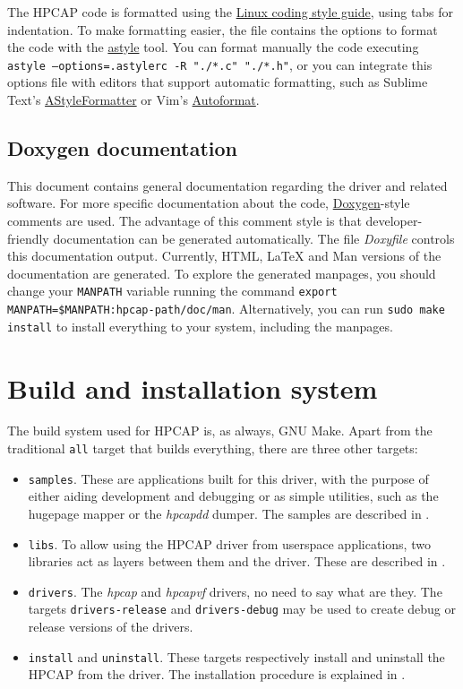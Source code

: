 \documentclass[oneside]{hpman}
\begin{document}
The HPCAP code is formatted using the \href{https://www.kernel.org/doc/Documentation/CodingStyle}{Linux coding style guide}, using tabs for indentation. To make formatting easier, the file  contains the options to format the code with the \href{http://astyle.sourceforge.net/astyle.html}{astyle} tool. You can format manually the code executing \texttt{astyle --options=.astylerc -R "./*.c" "./*.h"}, or you can integrate this options file with editors that support automatic formatting, such as Sublime Text's \href{https://github.com/timonwong/SublimeAStyleFormatter}{AStyleFormatter} or Vim's \href{https://github.com/Chiel92/vim-autoformat}{Autoformat}.

\section{Doxygen documentation}
\label{sec:doxygen}

This document contains general documentation regarding the driver and related software. For more specific documentation about the code, \href{http://www.stack.nl/~dimitri/doxygen/}{Doxygen}-style comments are used. The advantage of this comment style is that developer-friendly documentation can be generated automatically. The file \textit{Doxyfile} controls this documentation output. Currently, HTML, LaTeX and Man versions of the documentation are generated. To explore the generated manpages, you should change your \texttt{MANPATH} variable running the command \texttt{export MANPATH=\$MANPATH:hpcap-path/doc/man}. Alternatively, you can run \texttt{sudo make install} to install everything to your system, including the manpages.

\chapter{Build and installation system}
\label{sec:build}

The build system used for HPCAP is, as always, GNU Make. Apart from the traditional \texttt{all} target that builds everything, there are three other targets:

\begin{itemize}
\item \texttt{samples}. These are applications built for this driver, with the purpose of either aiding development and debugging or as simple utilities, such as the hugepage mapper or the \textit{hpcapdd} dumper. The samples are described in .
\item \texttt{libs}. To allow using the HPCAP driver from userspace applications, two libraries act as layers between them and the driver. These are described in .
\item \texttt{drivers}. The \textit{hpcap} and \textit{hpcapvf} drivers, no need to say what are they. The targets \texttt{drivers-release} and \texttt{drivers-debug} may be used to create debug or release versions of the drivers.
\item \texttt{install} and \texttt{uninstall}. These targets respectively install and uninstall the HPCAP from the driver. The installation procedure is explained in .
\end{itemize}
\end{document}
